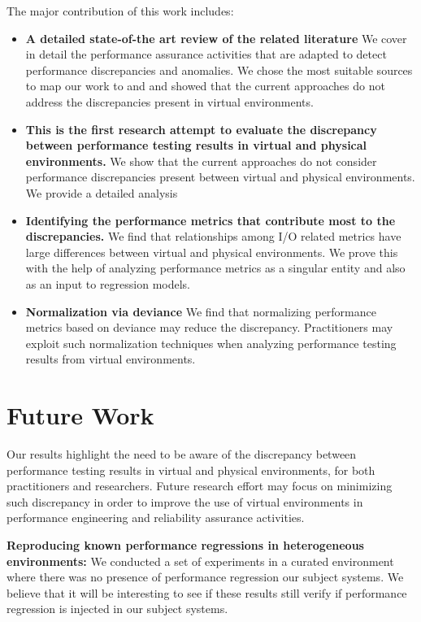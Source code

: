 The major contribution of this work includes: 
\begin{itemize} \itemsep -0.4pt 
	\item \textbf{A detailed state-of-the art review of the related literature} We cover in detail the performance assurance activities that are adapted to detect performance discrepancies and anomalies. We chose the most suitable  sources to map our work to and and showed that the current approaches do not address the discrepancies present in virtual environments.
	
	\item \textbf{This is the first research attempt to evaluate the discrepancy between performance testing results in virtual and physical environments.} We show that the current approaches do not consider performance discrepancies present between virtual and physical environments. We provide a detailed analysis 
	
	\item \textbf{Identifying the performance metrics that contribute most to the discrepancies.} We find that relationships among I/O related metrics have large differences between virtual and physical environments. We prove this with the help of analyzing performance metrics as a singular entity and also as an input to regression models.
	
	\item \textbf{Normalization via deviance} We find that normalizing performance metrics based on deviance may reduce the discrepancy. Practitioners may exploit such normalization techniques when analyzing performance testing results from virtual environments.
\end{itemize}


\section{Future Work}

Our results highlight the need to be aware of the discrepancy between performance testing results in virtual and physical environments, for both practitioners and researchers. Future research effort may focus on minimizing such discrepancy in order to improve the use of virtual environments in performance engineering and reliability assurance activities.

\textbf{Reproducing known performance regressions in heterogeneous environments:}
We conducted a set of experiments in a curated environment where there was no presence of performance regression our subject systems. We believe that it will be interesting to see if these results still verify if performance regression is injected in our subject systems.

